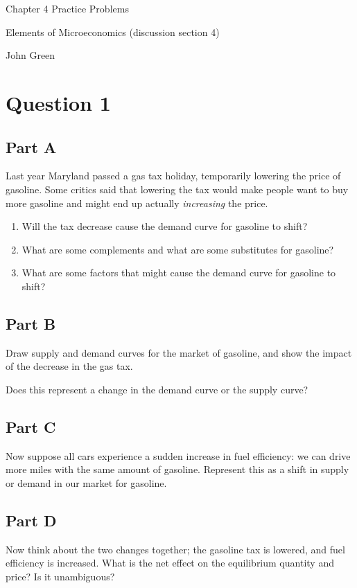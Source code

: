 \documentclass[12pt]{article}
\begin{document}
\begin{center}
\Large Chapter 4 Practice Problems

\medskip

\normalsize Elements of Microeconomics (discussion section 4)

\medskip

\small John Green
\end{center}

\medskip

\section*{Question 1}
\subsection*{Part A}
Last year Maryland passed a gas tax holiday, temporarily lowering the price of gasoline. Some critics said that lowering the tax would make people want to buy more gasoline and might end up actually \textit{increasing} the price.

\begin{enumerate}
    \item Will the tax decrease cause the demand curve for gasoline to shift?
    \item What are some complements and what are some substitutes for gasoline?
    \item What are some factors that might cause the demand curve for gasoline to shift?
\end{enumerate}

\subsection*{Part B}
Draw supply and demand curves for the market of gasoline, and show the impact of the decrease in the gas tax.

\medskip

Does this represent a change in the demand curve or the supply curve?

\subsection*{Part C}
Now suppose all cars experience a sudden increase in fuel efficiency: we can drive more miles with the same amount of gasoline. Represent this as a shift in supply or demand in our market for gasoline.

\subsection*{Part D}
Now think about the two changes together; the gasoline tax is lowered, and fuel efficiency is increased. What is the net effect on the equilibrium quantity and price? Is it unambiguous?
\end{document}

